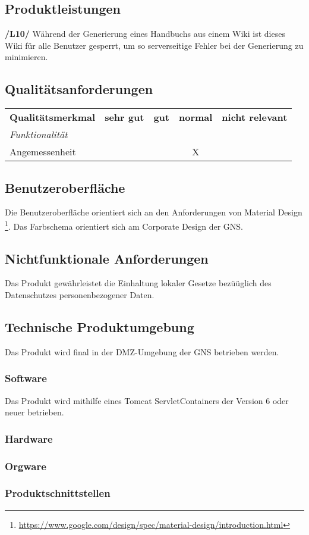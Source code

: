 \subsection{Produktleistungen}
	\textbf{/L10/}
		Während der Generierung eines Handbuchs aus einem Wiki ist dieses Wiki für alle Benutzer gesperrt, um so serverseitige Fehler bei der Generierung zu minimieren.


\subsection{Qualitätsanforderungen}
	\begin{table}[!ht]
		\centering
		\begin{tabular}{l|c|c|c|c}
			\rowcolor{gray!15}
			\textbf{Qualitätsmerkmal}	& \textbf{sehr gut}	& \textbf{gut}	& \textbf{normal}	& \textbf{nicht relevant}	\\
			\textit{Funktionalität} 	&					&				&					&							\\
			Angemessenheit				&					&				& X					&

		\end{tabular}
	\end{table}

\subsection{Benutzeroberfläche}
	Die Benutzeroberfläche orientiert sich an den Anforderungen von Material Design
	\footnote{\url{https://www.google.com/design/spec/material-design/introduction.html}}.
	Das Farbschema orientiert sich am Corporate Design der GNS.


\subsection{Nichtfunktionale Anforderungen}
	Das Produkt gewährleistet die Einhaltung lokaler Gesetze bezüüglich des Datenschutzes personenbezogener Daten.

\subsection{Technische Produktumgebung}

	Das Produkt wird final in der DMZ-Umgebung der GNS betrieben werden.

	\subsubsection{Software}
		Das Produkt wird mithilfe eines Tomcat ServletContainers der Version 6 oder neuer betrieben.

	\subsubsection{Hardware}

	\subsubsection{Orgware}

	\subsubsection{Produktschnittstellen}
